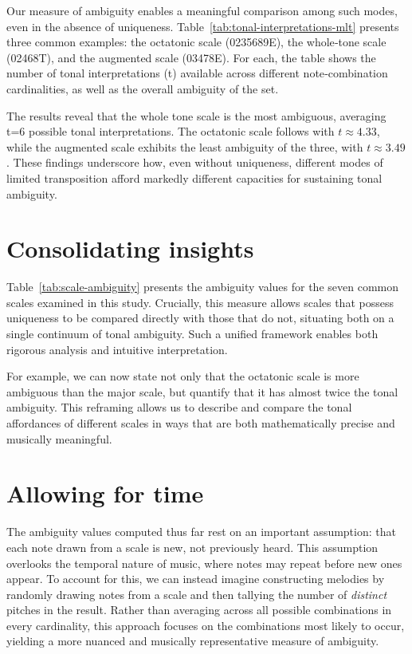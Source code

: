 \documentclass[10pt,twocolumn]{article}
\numberwithin{equation}{section} %
\begin{document}
Our measure of ambiguity enables a meaningful comparison among such
modes, even in the absence of uniqueness. Table~\ref{tab:tonal-interpretations-mlt} presents three common examples: the
octatonic scale (0235689E), the whole‑tone scale (02468T), and the augmented
scale (03478E). For each, the table shows the number of tonal interpretations (t)
available across different note‑combination cardinalities, as well as the
overall ambiguity of the set.

The results reveal that the whole tone scale is the most ambiguous,
averaging t=6 possible tonal interpretations. The octatonic scale follows with
$t \approx 4.33$, while the augmented scale exhibits the least ambiguity of the three,
with $t \approx 3.49$. These findings underscore how, even without uniqueness, different
modes of limited transposition afford markedly different capacities for
sustaining tonal ambiguity.



\section{Consolidating insights}

Table~\ref{tab:scale-ambiguity} presents the ambiguity
values for the seven common scales examined in this study. Crucially, this
measure allows scales that possess uniqueness to be compared directly with
those that do not, situating both on a single continuum of tonal ambiguity.
Such a unified framework enables both rigorous analysis and intuitive
interpretation.

For example, we
can now state not only that the octatonic scale is more ambiguous than the
major scale, but quantify that it has almost twice the tonal ambiguity. This
reframing allows us to describe and compare the tonal affordances of different
scales in ways that are both mathematically precise and musically meaningful.



\section{Allowing for time}

The ambiguity
values computed thus far rest on an important assumption: that each note drawn
from a scale is new, not previously heard. This assumption overlooks the
temporal nature of music, where notes may repeat before new ones appear. To
account for this, we can instead imagine constructing melodies by randomly
drawing notes from a scale and then tallying the number of \textit{distinct}
pitches in the result. Rather than averaging across all possible combinations
in every cardinality, this approach focuses on the combinations most likely to
occur, yielding a more nuanced and musically representative measure of
ambiguity.
\end{document}
